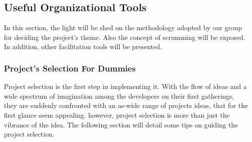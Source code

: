 \subsection{Useful Organizational Tools}
In this section, the light will be shed on the methodology adopted by our group for deciding the project's theme. Also the concept of scrumming will be exposed. In addition, other facilitation tools will be presented.

\subsubsection{Project's Selection For Dummies}
Project selection is the first step in implementing it. With the flow of ideas and a wide spectrum of imagination among the developers on their first gatherings, they are suddenly confronted with an as-wide range of projects ideas, that for the first glance seem appealing. however, project selection is more than just the vibrance of the idea. The following section will detail some tips on guiding the project selection.


